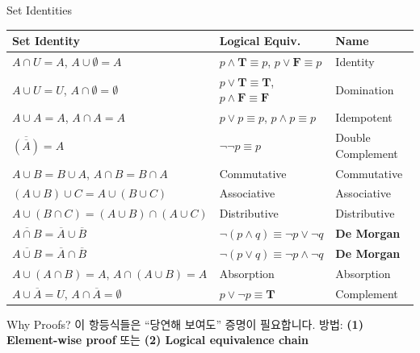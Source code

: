 \documentclass{beamer}
\begin{document}
\begin{frame}[t,shrink=8]{Set Identities}
    \vspace{0.05cm}
    \begin{center}
    \scriptsize
    \renewcommand{\arraystretch}{1.3}
    \begin{tabular}{lll}
        \toprule
        \textbf{Set Identity} & \textbf{Logical Equiv.} & \textbf{Name} \\
        \midrule
        $A \cap U = A$, \; $A \cup \emptyset = A$ & $p \land \mathbf{T} \equiv p$, \; $p \lor \mathbf{F} \equiv p$ & Identity \\
        $A \cup U = U$, \; $A \cap \emptyset = \emptyset$ & $p \lor \mathbf{T} \equiv \mathbf{T}$, \; $p \land \mathbf{F} \equiv \mathbf{F}$ & Domination \\
        $A \cup A = A$, \; $A \cap A = A$ & $p \lor p \equiv p$, \; $p \land p \equiv p$ & Idempotent \\
        $\overline{(\overline{A})} = A$ & $\neg\neg p \equiv p$ & Double Complement \\
        $A \cup B = B \cup A$, \; $A \cap B = B \cap A$ & Commutative & Commutative \\
        $(A \cup B) \cup C = A \cup (B \cup C)$ & Associative & Associative \\
        $A \cup (B \cap C) = (A \cup B) \cap (A \cup C)$ & Distributive & Distributive \\
        \rowcolor{lightblue}
        $\overline{A \cap B} = \overline{A} \cup \overline{B}$ & $\neg(p \land q) \equiv \neg p \lor \neg q$ & \textbf{De Morgan} \\
        \rowcolor{lightblue}
        $\overline{A \cup B} = \overline{A} \cap \overline{B}$ & $\neg(p \lor q) \equiv \neg p \land \neg q$ & \textbf{De Morgan} \\
        $A \cup (A \cap B) = A$, \; $A \cap (A \cup B) = A$ & Absorption & Absorption \\
        $A \cup \overline{A} = U$, \; $A \cap \overline{A} = \emptyset$ & $p \lor \neg p \equiv \mathbf{T}$ & Complement \\
        \bottomrule
    \end{tabular}
    \renewcommand{\arraystretch}{1}
    \end{center}

    \vspace{0.05cm}
    \begin{exampleblock}{\scriptsize Why Proofs?}
        \scriptsize 이 항등식들은 ``당연해 보여도'' 증명이 필요합니다. 방법: \textbf{(1) Element-wise proof} 또는 \textbf{(2) Logical equivalence chain}
    \end{exampleblock}
\end{frame}
\end{document}
